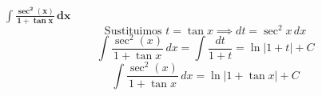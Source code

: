 $\displaystyle \mathbf{\int \frac{\sec^2(x)}{1+\tan x}\,dx}$
\nopagebreak
\[
\text{Sustituimos } t = \tan x \implies dt = \sec^2 x\, dx
\]
\[
\int \frac{\sec^2(x)}{1+\tan x}\,dx = \int \frac{dt}{1+t} = \ln|1+t| + C
\]
\[
\boxed{\displaystyle 
\int \frac{\sec^2(x)}{1+\tan x}\,dx = \ln|1+\tan x| + C
}
\]
